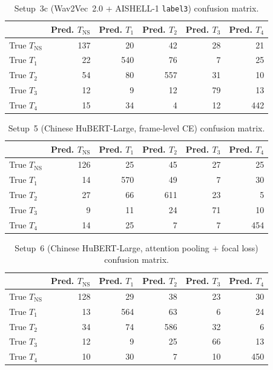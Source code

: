\begin{table}[H]
\centering
\caption{Setup~3c (Wav2Vec~2.0 + AISHELL-1 \texttt{label3}) confusion matrix.}
\label{tab:app:cm_w2v_aishell_l3}
\small
\begin{tabular}{@{}lrrrrr@{}}
\toprule
 & \textbf{Pred. \(T_{\mathrm{NS}}\)} & \textbf{Pred. \(T_1\)} & \textbf{Pred. \(T_2\)} & \textbf{Pred. \(T_3\)} & \textbf{Pred. \(T_4\)} \\
\midrule
True \(T_{\mathrm{NS}}\) & 137 &  20 &  42 & 28 &  21 \\
True \(T_1\)             &  22 & 540 &  76 &  7 &  25 \\
True \(T_2\)             &  54 &  80 & 557 & 31 &  10 \\
True \(T_3\)             &  12 &   9 &  12 & 79 &  13 \\
True \(T_4\)             &  15 &  34 &   4 & 12 & 442 \\
\bottomrule
\end{tabular}
\end{table}

\begin{table}[H]
\centering
\caption{Setup~5 (Chinese HuBERT-Large, frame-level CE) confusion matrix.}
\label{tab:app:cm_hubert_ce}
\small
\begin{tabular}{@{}lrrrrr@{}}
\toprule
 & \textbf{Pred. \(T_{\mathrm{NS}}\)} & \textbf{Pred. \(T_1\)} & \textbf{Pred. \(T_2\)} & \textbf{Pred. \(T_3\)} & \textbf{Pred. \(T_4\)} \\
\midrule
True \(T_{\mathrm{NS}}\) & 126 &  25 &  45 & 27 &  25 \\
True \(T_1\)             &  14 & 570 &  49 &  7 &  30 \\
True \(T_2\)             &  27 &  66 & 611 & 23 &   5 \\
True \(T_3\)             &   9 &  11 &  24 & 71 &  10 \\
True \(T_4\)             &  14 &  25 &   7 &  7 & 454 \\
\bottomrule
\end{tabular}
\end{table}

\begin{table}[H]
\centering
\caption{Setup~6 (Chinese HuBERT-Large, attention pooling $+$ focal loss) confusion matrix.}
\label{tab:app:cm_hubert_attn}
\small
\begin{tabular}{@{}lrrrrr@{}}
\toprule
 & \textbf{Pred. \(T_{\mathrm{NS}}\)} & \textbf{Pred. \(T_1\)} & \textbf{Pred. \(T_2\)} & \textbf{Pred. \(T_3\)} & \textbf{Pred. \(T_4\)} \\
\midrule
True \(T_{\mathrm{NS}}\) & 128 &  29 &  38 & 23 &  30 \\
True \(T_1\)             &  13 & 564 &  63 &  6 &  24 \\
True \(T_2\)             &  34 &  74 & 586 & 32 &   6 \\
True \(T_3\)             &  12 &   9 &  25 & 66 &  13 \\
True \(T_4\)             &  10 &  30 &   7 & 10 & 450 \\
\bottomrule
\end{tabular}
\end{table}

